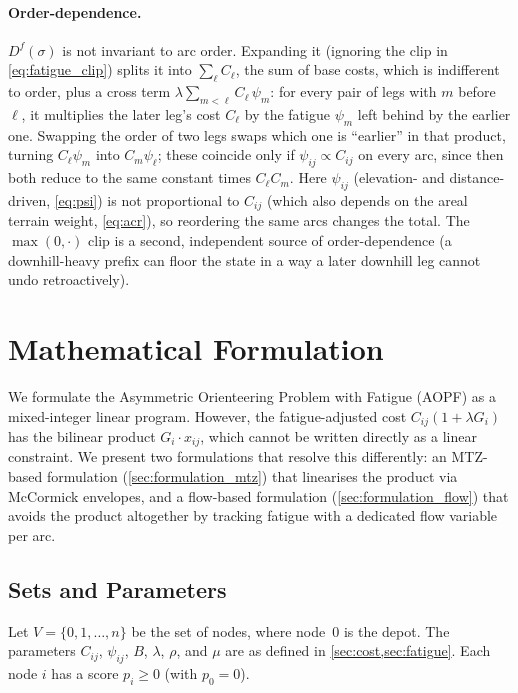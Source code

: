 \documentclass[11pt,a4paper]{article}
\begin{document}
\paragraph{Order-dependence.}
\label{sec:order-dependence}
$D^f(\sigma)$ is not invariant to arc order. Expanding it (ignoring the clip in \cref{eq:fatigue_clip}) splits it into $\sum_\ell C_\ell$, the sum of base costs, which is indifferent to order, plus a cross term $\lambda \sum_{m<\ell} C_\ell\,\psi_m$: for every pair of legs with $m$ before $\ell$, it multiplies the later leg's cost $C_\ell$ by the fatigue $\psi_m$ left behind by the earlier one.
Swapping the order of two legs swaps which one is ``earlier'' in that product, turning $C_\ell\psi_m$ into $C_m\psi_\ell$; these coincide only if $\psi_{ij} \propto C_{ij}$ on every arc, since then both reduce to the same constant times $C_\ell C_m$.
Here $\psi_{ij}$ (elevation- and distance-driven, \cref{eq:psi}) is not proportional to $C_{ij}$ (which also depends on the areal terrain weight, \cref{eq:acr}), so reordering the same arcs changes the total.
The $\max(0,\cdot)$ clip is a second, independent source of order-dependence (a downhill-heavy prefix can floor the state in a way a later downhill leg cannot undo retroactively).


\section{Mathematical Formulation}
\label{sec:formulation}

We formulate the Asymmetric Orienteering Problem with Fatigue (AOPF) as a mixed-integer linear program.
However, the fatigue-adjusted cost $C_{ij}(1+\lambda G_i)$ has the bilinear product $G_i \cdot x_{ij}$, which cannot be written directly as a linear constraint.
We present two formulations that resolve this differently: an MTZ-based formulation (\cref{sec:formulation_mtz}) that linearises the product via McCormick envelopes, and a flow-based formulation (\cref{sec:formulation_flow}) that avoids the product altogether by tracking fatigue with a dedicated flow variable per arc.

\subsection{Sets and Parameters}

Let $V = \{0, 1, \ldots, n\}$ be the set of nodes, where node~0 is the depot.
The parameters $C_{ij}$, $\psi_{ij}$, $B$, $\lambda$, $\rho$, and $\mu$ are as defined in \cref{sec:cost,sec:fatigue}.
Each node $i$ has a score $p_i \geq 0$ (with $p_0 = 0$).
\end{document}
